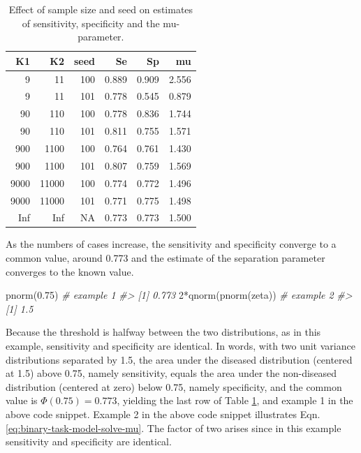 \documentclass[
]{book}
\newenvironment{Shaded}{\begin{snugshade}}{\end{snugshade}}
\newcommand{\CommentTok}[1]{\textcolor[rgb]{0.56,0.35,0.01}{\textit{#1}}}
\newcommand{\DecValTok}[1]{\textcolor[rgb]{0.00,0.00,0.81}{#1}}
\newcommand{\FloatTok}[1]{\textcolor[rgb]{0.00,0.00,0.81}{#1}}
\newcommand{\FunctionTok}[1]{\textcolor[rgb]{0.00,0.00,0.00}{#1}}
\newcommand{\NormalTok}[1]{#1}
\newcommand{\SpecialCharTok}[1]{\textcolor[rgb]{0.00,0.00,0.00}{#1}}
\begin{document}
\begin{table}

\caption{\label{tab:binary-task-modelSeSpMuvsCaseSizeSeed}Effect of sample size and seed on estimates of sensitivity, specificity and the mu-parameter.}
\centering
\begin{tabular}[t]{r|r|r|r|r|r}
\hline
K1 & K2 & seed & Se & Sp & mu\\
\hline
9 & 11 & 100 & 0.889 & 0.909 & 2.556\\
\hline
9 & 11 & 101 & 0.778 & 0.545 & 0.879\\
\hline
90 & 110 & 100 & 0.778 & 0.836 & 1.744\\
\hline
90 & 110 & 101 & 0.811 & 0.755 & 1.571\\
\hline
900 & 1100 & 100 & 0.764 & 0.761 & 1.430\\
\hline
900 & 1100 & 101 & 0.807 & 0.759 & 1.569\\
\hline
9000 & 11000 & 100 & 0.774 & 0.772 & 1.496\\
\hline
9000 & 11000 & 101 & 0.771 & 0.775 & 1.498\\
\hline
Inf & Inf & NA & 0.773 & 0.773 & 1.500\\
\hline
\end{tabular}
\end{table}

As the numbers of cases increase, the sensitivity and specificity converge to a common value, around 0.773 and the estimate of the separation parameter converges to the known value.

\begin{Shaded}
\begin{Highlighting}[]
\FunctionTok{pnorm}\NormalTok{(}\FloatTok{0.75}\NormalTok{) }\CommentTok{\# example 1}
\CommentTok{\#\textgreater{} [1] 0.773}
\DecValTok{2}\SpecialCharTok{*}\FunctionTok{qnorm}\NormalTok{(}\FunctionTok{pnorm}\NormalTok{(zeta)) }\CommentTok{\# example 2}
\CommentTok{\#\textgreater{} [1] 1.5}
\end{Highlighting}
\end{Shaded}

Because the threshold is halfway between the two distributions, as in this example, sensitivity and specificity are identical. In words, with two unit variance distributions separated by 1.5, the area under the diseased distribution (centered at 1.5) above 0.75, namely sensitivity, equals the area under the non-diseased distribution (centered at zero) below 0.75, namely specificity, and the common value is \(\Phi(0.75)= 0.773\), yielding the last row of Table \ref{tab:binary-task-modelSeSpMuvsCaseSizeSeed}, and example 1 in the above code snippet. Example 2 in the above code snippet illustrates Eqn. \eqref{eq:binary-task-model-solve-mu}. The factor of two arises since in this example sensitivity and specificity are identical.
\end{document}
